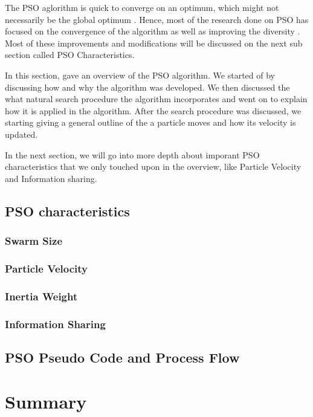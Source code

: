 The PSO aglorithm is quick to converge on an optimum, which might not necessarily be the global optimum \cite{PSOSelfHierarch}. Hence, most of the research done on PSO has focused on the convergence of the algorithm as well as improving the diversity \cite{FundamentalSwarm}. Most of these improvements and modifications will be discussed on the next sub section called PSO Characteristics.

In this section, gave an overview of the PSO algorithm. We started of by discussing how and why the algorithm was developed. We then discussed the what natural search procedure the algorithm incorporates and went on to explain how it is applied in the algorithm. After the search procedure was discussed, we starting giving a general outline of the a particle moves and how its velocity is updated. 

In the next section, we will go into more depth about imporant PSO characteristics that we only touched upon in the overview, like Particle Velocity and Information sharing.

\subsection{PSO characteristics}
\subsubsection{Swarm Size}
\subsubsection{Particle Velocity}
\subsubsection{Inertia Weight}
\subsubsection{Information Sharing}
\subsection{PSO Pseudo Code and Process Flow}

\section{Summary}
